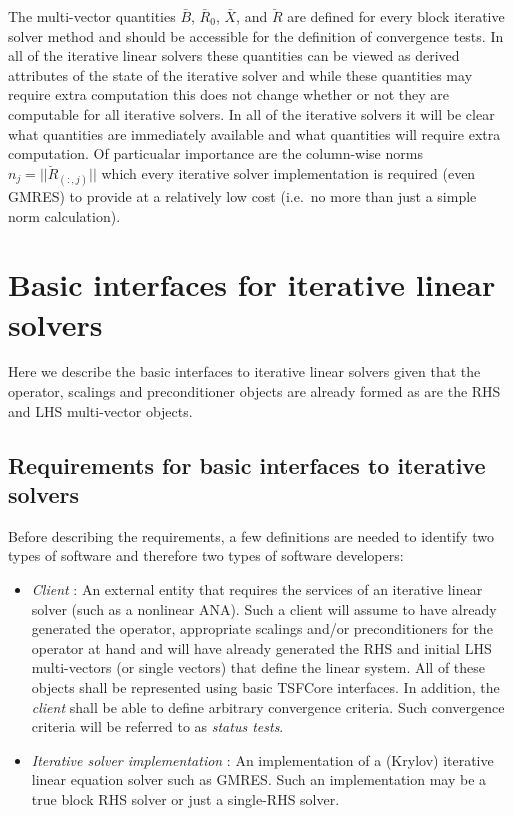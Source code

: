 \documentclass[pdf,ps2pdf,11pt]{SANDreport}
\begin{document}
The multi-vector quantities $\bar{B}$, $\bar{R}_0$, $\bar{X}$, and
$\breve{R}$ are defined for every block iterative solver method and
should be accessible for the definition of convergence tests.  In all
of the iterative linear solvers these quantities can be viewed as
derived attributes of the state of the iterative solver and while
these quantities may require extra computation this does not change
whether or not they are computable for all iterative solvers.  In all
of the iterative solvers it will be clear what quantities are
immediately available and what quantities will require extra
computation.  Of particualar importance are the column-wise norms $n_j
= ||\breve{R}_{(:,j)}||$ which every iterative solver implementation
is required (even GMRES) to provide at a relatively low cost (i.e.~no
more than just a simple norm calculation).

%
\section{Basic interfaces for iterative linear solvers}
%

Here we describe the basic interfaces to iterative linear solvers
given that the operator, scalings and preconditioner objects are
already formed as are the RHS and LHS multi-vector objects.

%
\subsection{Requirements for basic interfaces to iterative solvers}
\label{sec:requirements}
%

Before describing the requirements, a few definitions are needed to
identify two types of software and therefore two types of software
developers:

\begin{itemize}

\item{}\textit{Client} :
An external entity that requires the services of an iterative linear
solver (such as a nonlinear ANA).  Such a client will assume to have
already generated the operator, appropriate scalings and/or
preconditioners for the operator at hand and will have already
generated the RHS and initial LHS multi-vectors (or single vectors)
that define the linear system.  All of these objects shall be
represented using basic TSFCore interfaces.  In addition, the
{}\textit{client} shall be able to define arbitrary convergence
criteria.  Such convergence criteria will be referred to as
{}\textit{status tests}.

\item{}\textit{Iterative solver implementation} : 
An implementation of a (Krylov) iterative linear equation solver such
as GMRES.  Such an implementation may be a true block RHS solver or
just a single-RHS solver.

\end{itemize}
\end{document}
